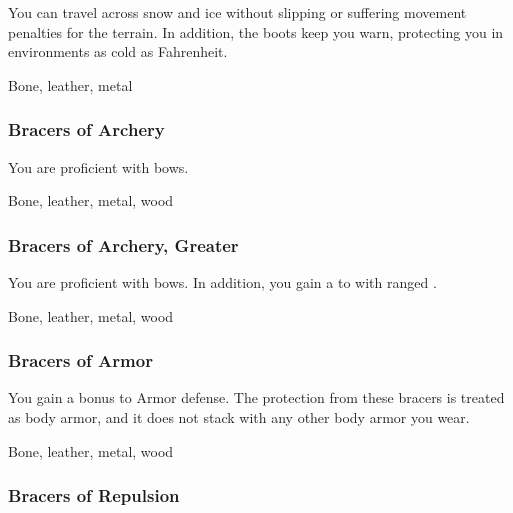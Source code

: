 You can travel across snow and ice without slipping or suffering movement penalties for the terrain.
In addition, the boots keep you warn, protecting you in environments as cold as  Fahrenheit.



 Bone, leather, metal


\lowercase{\hypertarget{item:Bracers of Archery}{}}\label{item:Bracers of Archery}
\hypertarget{item:Bracers of Archery}{\subsubsection{Bracers of Archery\hfill{}}}

You are proficient with bows.



 Bone, leather, metal, wood


\lowercase{\hypertarget{item:Bracers of Archery, Greater}{}}\label{item:Bracers of Archery, Greater}
\hypertarget{item:Bracers of Archery, Greater}{\subsubsection{Bracers of Archery, Greater\hfill{}}}

You are proficient with bows.
In addition, you gain a   to  with ranged .



 Bone, leather, metal, wood


\lowercase{\hypertarget{item:Bracers of Armor}{}}\label{item:Bracers of Armor}
\hypertarget{item:Bracers of Armor}{\subsubsection{Bracers of Armor\hfill{}}}

You gain a  bonus to Armor defense.
The protection from these bracers is treated as body armor, and it does not stack with any other body armor you wear.



 


 Bone, leather, metal, wood


\lowercase{\hypertarget{item:Bracers of Repulsion}{}}\label{item:Bracers of Repulsion}
\hypertarget{item:Bracers of Repulsion}{\subsubsection{Bracers of Repulsion\hfill{}}}


